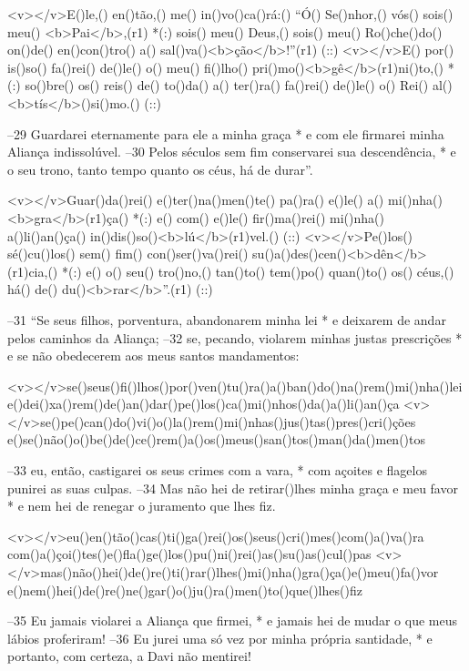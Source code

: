 <v></v>E()le,() en()tão,() me() in()vo()ca()rá:() ``Ó() Se()nhor,() vós() sois() meu() <b>Pai</b>,(r1) *(:)
sois() meu() Deus,() sois() meu() Ro()che()do() on()de() en()con()tro() a() sal()va()<b>ção</b>!''(r1) (::)
<v></v>E() por() is()so() fa()rei() de()le() o() meu() fi()lho() pri()mo()<b>gê</b>(r1)ni()to,() *(:)
so()bre() os() reis() de() to()da() a() ter()ra() fa()rei() de()le() o() Rei() al()<b>tís</b>()si()mo.() (::)

–29 Guardarei eternamente para ele a minha graça *
e com ele firmarei minha Aliança indissolúvel. 
–30 Pelos séculos sem fim conservarei sua descendência, *
e o seu trono, tanto tempo quanto os céus, há de durar”.

<v></v>Guar()da()rei() e()ter()na()men()te() pa()ra() e()le() a() mi()nha() <b>gra</b>(r1)ça() *(:)
e() com() e()le() fir()ma()rei() mi()nha() a()li()an()ça() in()dis()so()<b>lú</b>(r1)vel.() (::)
<v></v>Pe()los() sé()cu()los() sem() fim() con()ser()va()rei() su()a()des()cen()<b>dên</b>(r1)cia,() *(:)
e() o() seu() tro()no,() tan()to() tem()po() quan()to() os() céus,() há() de() du()<b>rar</b>''.(r1) (::)

–31 “Se seus filhos, porventura, abandonarem minha lei *
e deixarem de andar pelos caminhos da Aliança; 
–32 se, pecando, violarem minhas justas prescrições *
e se não obedecerem aos meus santos mandamentos:

<v></v>se()seus()fi()lhos()por()ven()tu()ra()a()ban()do()na()rem()mi()nha()lei
e()dei()xa()rem()de()an()dar()pe()los()ca()mi()nhos()da()a()li()an()ça
<v></v>se()pe()can()do()vi()o()la()rem()mi()nhas()jus()tas()pres()cri()ções
e()se()não()o()be()de()ce()rem()a()os()meus()san()tos()man()da()men()tos

–33 eu, então, castigarei os seus crimes com a vara, *
com açoites e flagelos punirei as suas culpas. 
–34 Mas não hei de retirar()lhes minha graça e meu favor *
e nem hei de renegar o juramento que lhes fiz.

<v></v>eu()en()tão()cas()ti()ga()rei()os()seus()cri()mes()com()a()va()ra
com()a()çoi()tes()e()fla()ge()los()pu()ni()rei()as()su()as()cul()pas
<v></v>mas()não()hei()de()re()ti()rar()lhes()mi()nha()gra()ça()e()meu()fa()vor
e()nem()hei()de()re()ne()gar()o()ju()ra()men()to()que()lhes()fiz

–35 Eu jamais violarei a Aliança que firmei, *
e jamais hei de mudar o que meus lábios proferiram! 
–36 Eu jurei uma só vez por minha própria santidade, *
e portanto, com certeza, a Davi não mentirei!

